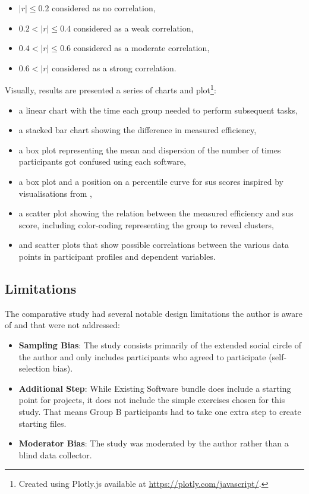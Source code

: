 \begin{itemize}
    \item $|r| \le 0.2$ considered as no correlation,
    \item $0.2 < |r| \le 0.4$ considered as a weak correlation,
    \item $0.4 < |r| \le 0.6$ considered as a moderate correlation,
    \item $0.6 < |r|$ considered as a strong correlation.
\end{itemize}

Visually, results are presented a series of charts and plot\footnote{Created using Plotly.js available at \url{https://plotly.com/javascript/}.}:

\begin{itemize}
    \item a linear chart with the time each group needed to perform subsequent tasks,
    \item a stacked bar chart showing the difference in measured efficiency,
    \item a box plot representing the mean and dispersion of the number of times participants got confused using each software,
    \item a box plot and a position on a percentile curve for \gls{sus} scores inspired by visualisations from \textcite{Blattgerste_2022},
    \item a scatter plot showing the relation between the measured efficiency and \gls{sus} score, including color-coding representing the group to reveal clusters,
    \item and scatter plots that show possible correlations between the various data points in participant profiles and dependent variables.
\end{itemize}

\subsection{Limitations}

The comparative study had several notable design limitations the author is aware of and that were not addressed:

\begin{itemize}
    \item \textbf{Sampling Bias}: The study consists primarily of the extended social circle of the author and only includes participants who agreed to participate (self-selection bias).
    \item \textbf{Additional Step}: While Existing Software bundle does include a starting point for projects, it does not include the simple exercises chosen for this study. That means Group B participants had to take one extra step to create starting files.
    \item \textbf{Moderator Bias}: The study was moderated by the author rather than a blind data collector.
\end{itemize}
